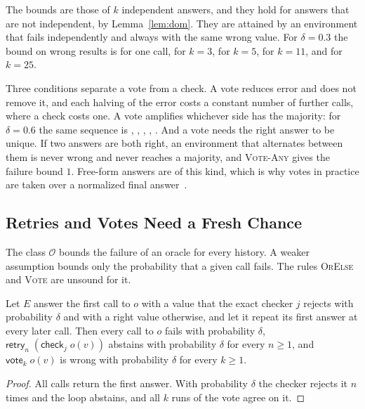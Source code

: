 \documentclass[acmsmall,nonacm,screen]{acmart}
\newcommand{\kw}[1]{\mathsf{#1}}
\newcommand{\chk}[2]{\kw{check}_{#1}\;#2}
\newcommand{\vote}[2]{\kw{vote}_{#1}\;#2}
\newcommand{\retry}[2]{\kw{retry}_{#1}\;#2}
\newcommand{\cO}{\mathcal{O}}
\begin{document}
The bounds are those of $k$ independent answers, and they hold for answers that are not
independent, by Lemma~\ref{lem:dom}. They are attained by an environment that fails
independently and always with the same wrong value. For $\delta = 0.3$ the bound on wrong
results is \exVoteOne{} for one call, \exVoteThree{} for $k = 3$, \exVoteFive{} for $k = 5$,
\exVoteEleven{} for $k = 11$, and \exVoteTwentyFive{} for $k = 25$.

Three conditions separate a vote from a check. A vote reduces error and does not remove it,
and each halving of the error costs a constant number of further calls, where a check costs
one. A vote amplifies whichever side has the majority: for $\delta = 0.6$ the same sequence
is \exVoteBadOne, \exVoteBadThree, \exVoteBadFive, \exVoteBadEleven, \exVoteBadTwentyFive. And
a vote needs the right answer to be unique. If two answers are both right, an environment
that alternates between them is never wrong and never reaches a majority, and
\textsc{Vote-Any} gives the failure bound $1$. Free-form answers are of this kind, which is
why votes in practice are taken over a normalized final answer~\citep{wang2022}.

\subsection{Retries and Votes Need a Fresh Chance}
\label{sec:fresh}

The class $\cO$ bounds the failure of an oracle for every history. A weaker assumption bounds
only the probability that a given call fails. The rules \textsc{OrElse} and \textsc{Vote} are
unsound for it.

\begin{proposition}
\label{prop:repeat}
Let $E$ answer the first call to $o$ with a value that the exact checker $j$ rejects with
probability $\delta$ and with a right value otherwise, and let it repeat its first answer at
every later call. Then every call to $o$ fails with probability $\delta$,
$\retry{n}{(\chk{j}{o(v)})}$ abstains with probability $\delta$ for every $n \ge 1$, and
$\vote{k}{o(v)}$ is wrong with probability $\delta$ for every $k \ge 1$.
\end{proposition}

\begin{proof}
All calls return the first answer. With probability $\delta$ the checker rejects it $n$
times and the loop abstains, and all $k$ runs of the vote agree on it.
\end{proof}
\end{document}
